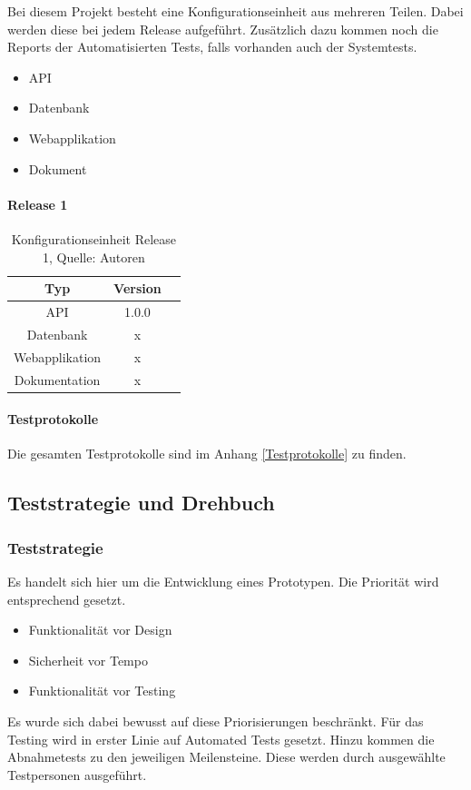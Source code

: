 Bei diesem Projekt besteht eine Konfigurationseinheit aus mehreren Teilen. Dabei werden diese bei jedem Release aufgeführt. Zusätzlich dazu kommen noch die Reports der Automatisierten Tests, falls vorhanden auch der Systemtests.
\begin{itemize}
\item API
\item Datenbank
\item Webapplikation
\item Dokument
\end{itemize}
\paragraph{Release 1}

\begin{table}[H]
\setlength\extrarowheight{2pt} %
\begin{tabularx}{\textwidth}{|C|C|C|}
\hline
\textbf{Typ} &  \textbf{Version}  \\

\hline
API & 1.0.0\\
\hline
Datenbank &  x\\
\hline
Webapplikation  & x\\
\hline
Dokumentation & x\\
\hline
\end{tabularx}
\caption{ \label{tbl: Konfigurationseinheit Release 1}Konfigurationseinheit Release 1, Quelle: Autoren}
\end{table}

\paragraph{Testprotokolle}
Die gesamten Testprotokolle sind im Anhang \ref{Testprotokolle} zu finden. 
\newpage
\subsection{Teststrategie und Drehbuch}
\subsubsection{Teststrategie}
Es handelt sich hier um die Entwicklung eines Prototypen. Die Priorität wird entsprechend gesetzt. 
\begin{itemize}
	\item Funktionalität vor Design
	\item Sicherheit vor Tempo
	\item Funktionalität vor Testing
\end{itemize}
Es wurde sich dabei bewusst auf diese Priorisierungen beschränkt. 
Für das Testing wird in erster Linie auf Automated Tests gesetzt. Hinzu kommen die Abnahmetests zu den jeweiligen Meilensteine. Diese werden durch ausgewählte Testpersonen ausgeführt. 

